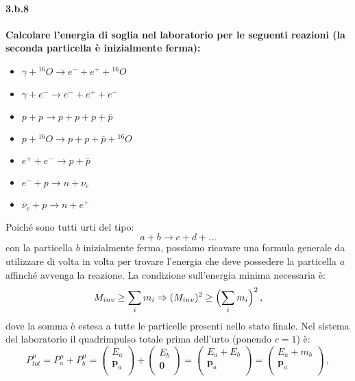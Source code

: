 \documentclass[twoside]{article}
\begin{document}
\paragraph{3.b.8}\textbf{Calcolare l’energia di soglia nel laboratorio per le seguenti reazioni (la seconda particella è inizialmente ferma):}
\begin{itemize}
    \item $\gamma+{}^{16}O\longrightarrow e^-+e^++{}^{16}O$
    \item $\gamma+e^-\longrightarrow e^-+e^++e^-$
    \item $p+p\longrightarrow p+p+p+\bar{p}$
    \item $p+{}^{16}O\longrightarrow p+p+\bar{p}+{}^{16}O$
    \item $e^++e^-\longrightarrow p+\bar{p}$
    \item $ e^-+p \longrightarrow n+\nu_e$
    \item $ \bar{\nu}_e +p\longrightarrow n+e^+$
\end{itemize}
Poiché sono tutti urti del tipo:
\begin{equation*}
a+b \longrightarrow c + d +...
\end{equation*}
con la particella $b$ inizialmente ferma, possiamo ricavare una formula generale da utilizzare di volta in volta per trovare l'energia che deve possedere la particella $a$ affinché avvenga la reazione. La condizione sull'energia minima necessaria è:
\begin{equation}\label{esoglia}
M_{inv} \geq \sum\limits_{i} m_i \Rightarrow (M_{inv})^2 \geq \Bigl( \sum\limits_{i} m_i \Bigr)^2 \, ,
\end{equation}
dove la somma è estesa a tutte le particelle presenti nello stato finale. Nel sistema del laboratorio il quadrimpulso totale prima dell'urto (ponendo $c=1$) è:
\begin{equation*}
P^{\mu}_{tot}=P^\mu_a+P^\mu_b=
\begin{pmatrix}
E_a \\
\mathbf{p}_a \\
\end{pmatrix}
+
\begin{pmatrix}
E_b \\
\mathbf{0} \\
\end{pmatrix}
=
\begin{pmatrix}
E_a + E_b \\
\mathbf{p}_a \\
\end{pmatrix}
=
\begin{pmatrix}
E_a+m_b \\
\mathbf{p}_a \\
\end{pmatrix} \, ,
\end{equation*}
\end{document}
